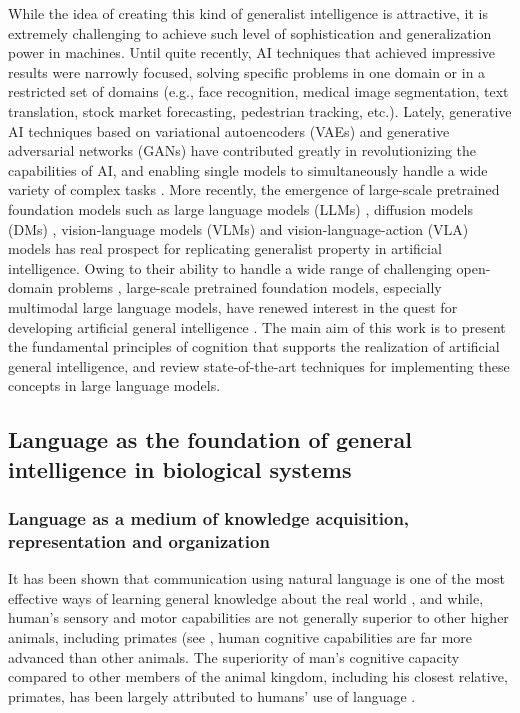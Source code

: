 \documentclass[10pt,journal,compsoc]{IEEEtran}
\begin{document}
	
	While the idea of creating this kind of generalist intelligence is attractive, it is extremely challenging to achieve such level of sophistication and generalization power in machines. Until quite recently, AI techniques that achieved impressive results were narrowly focused, solving specific problems in one domain or in a restricted set of domains (e.g., face recognition, medical image segmentation, text translation, stock market forecasting, pedestrian tracking, etc.). Lately, generative AI techniques based on variational autoencoders (VAEs) \cite{kingma2013auto} and generative adversarial networks (GANs) \cite{isola2017image} have contributed greatly in revolutionizing the capabilities of AI, and enabling single models to simultaneously handle a wide variety of complex tasks \cite{bond2021deep}. More recently, the emergence of large-scale pretrained foundation models such as large language models (LLMs) \cite{minaee2024large}, diffusion models (DMs) \cite{croitoru2023diffusion}, vision-language models (VLMs) \cite{du2022survey} and vision-language-action (VLA) models \cite{ma2024survey} has real prospect for replicating generalist property in artificial intelligence.  Owing to their ability to handle a wide range of challenging open-domain problems \cite{bubeck2023sparks,y2023artificial,firoozi2023foundation,yu2024seqgpt }, large-scale pretrained foundation models, especially multimodal large language models, have renewed interest in the quest for developing artificial general intelligence \cite{y2023artificial}. The main aim of this work is to present the fundamental principles of cognition that supports the realization of artificial general intelligence, and review state-of-the-art techniques for implementing these concepts in large language models. 
	
	
	
	
	\subsection{Language as the foundation of general intelligence in biological systems}
	
	
	\subsubsection{Language as a medium of knowledge acquisition, representation and organization}
	It has been shown that communication using natural language is one of the most effective ways of learning general knowledge about the real world \cite{mohanty2023transforming}, and while, human's sensory and motor capabilities are not generally superior to other higher animals, including primates (see \cite{spelke2003makes,prestrude1970sensory,doble2014animal,mendoza2014motor,felleman1991distributed,thelen1984learning,ackermann2014brain}, human cognitive capabilities are far more advanced than other animals. The superiority of man’s cognitive capacity compared to other members of the animal kingdom, including his closest relative, primates, has been largely attributed to humans’ use of language \cite{novack2020becoming,bourguignon2023emergence, grigorenko2023never}.
	
\end{document}
